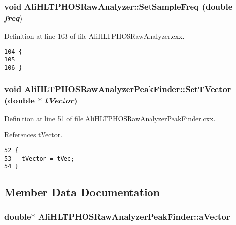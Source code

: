 \subsubsection{\setlength{\rightskip}{0pt plus 5cm}void Ali\-HLTPHOSRaw\-Analyzer::Set\-Sample\-Freq (double {\em freq})\hspace{0.3cm}{\tt  [inherited]}}\label{classAliHLTPHOSRawAnalyzer_AliHLTPHOSRawAnalyzerPeakFindera13}




Definition at line 103 of file Ali\-HLTPHOSRaw\-Analyzer.cxx.

\footnotesize\begin{verbatim}104 {
105 
106 }
\end{verbatim}\normalsize 


\subsubsection{\setlength{\rightskip}{0pt plus 5cm}void Ali\-HLTPHOSRaw\-Analyzer\-Peak\-Finder::Set\-TVector (double $\ast$ {\em t\-Vector})}\label{classAliHLTPHOSRawAnalyzerPeakFinder_AliHLTPHOSRawAnalyzerPeakFindera4}




Definition at line 51 of file Ali\-HLTPHOSRaw\-Analyzer\-Peak\-Finder.cxx.

References t\-Vector.

\footnotesize\begin{verbatim}52 {
53   tVector = tVec;
54 }
\end{verbatim}\normalsize 




\subsection{Member Data Documentation}
\subsubsection{\setlength{\rightskip}{0pt plus 5cm}double$\ast$ {\bf Ali\-HLTPHOSRaw\-Analyzer\-Peak\-Finder::a\-Vector}\hspace{0.3cm}{\tt  [private]}}\label{classAliHLTPHOSRawAnalyzerPeakFinder_AliHLTPHOSRawAnalyzerPeakFinderr1}


